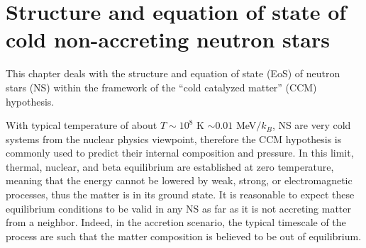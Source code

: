 %

\chapter{Structure and equation of state of cold non-accreting neutron stars}

This chapter deals with the structure and equation of state (EoS) of neutron 
stars (NS) within the framework of the ``cold catalyzed matter'' 
(CCM) hypothesis.

With typical temperature of about $T \sim 10^8$ K $\sim 0.01$ MeV$/k_B$, NS are 
very cold systems from the nuclear physics viewpoint, therefore the CCM hypothesis 
is commonly used to predict their internal composition and pressure. In this 
limit, thermal, nuclear, and beta equilibrium are established at zero
temperature, meaning that the energy cannot be lowered by weak, strong, or 
electromagnetic processes, thus the matter is in its ground state. It is 
reasonable to expect these equilibrium conditions to be valid in any NS as far 
as it is not accreting matter from a neighbor. Indeed, in the accretion 
scenario, the typical timescale of the process are such that the matter
composition is believed to be out of equilibrium.

